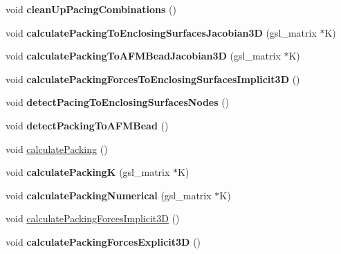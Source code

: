 \begin{DoxyCompactItemize}
\item 
\hypertarget{classSimulation_a7fd4e3930d7be7332fbfd13111c8dedb}{}void {\bfseries clean\+Up\+Pacing\+Combinations} ()\label{classSimulation_a7fd4e3930d7be7332fbfd13111c8dedb}

\item 
\hypertarget{classSimulation_a4b259e3827b74767c8005b2126191609}{}void {\bfseries calculate\+Packing\+To\+Enclosing\+Surfaces\+Jacobian3\+D} (gsl\+\_\+matrix $\ast$K)\label{classSimulation_a4b259e3827b74767c8005b2126191609}

\item 
\hypertarget{classSimulation_abc750480132f54e8b02f24d771863de2}{}void {\bfseries calculate\+Packing\+To\+A\+F\+M\+Bead\+Jacobian3\+D} (gsl\+\_\+matrix $\ast$K)\label{classSimulation_abc750480132f54e8b02f24d771863de2}

\item 
\hypertarget{classSimulation_a3b2d417e1f2814ffd8e34c186508c2f2}{}void {\bfseries calculate\+Packing\+Forces\+To\+Enclosing\+Surfaces\+Implicit3\+D} ()\label{classSimulation_a3b2d417e1f2814ffd8e34c186508c2f2}

\item 
\hypertarget{classSimulation_ac1225a76f3acef7e6ecc175d386b6b86}{}void {\bfseries detect\+Pacing\+To\+Enclosing\+Surfaces\+Nodes} ()\label{classSimulation_ac1225a76f3acef7e6ecc175d386b6b86}

\item 
\hypertarget{classSimulation_a44e5a4a5419d9d12cf0033ccd288b66c}{}void {\bfseries detect\+Packing\+To\+A\+F\+M\+Bead} ()\label{classSimulation_a44e5a4a5419d9d12cf0033ccd288b66c}

\item 
void \hyperlink{classSimulation_a51cb5448f660eeefc54a5d2a33ab561e}{calculate\+Packing} ()
\item 
\hypertarget{classSimulation_a64a53ebf4200a7a0c4b58ccca52d008b}{}void {\bfseries calculate\+Packing\+K} (gsl\+\_\+matrix $\ast$K)\label{classSimulation_a64a53ebf4200a7a0c4b58ccca52d008b}

\item 
\hypertarget{classSimulation_a4e93c41adbaf7ab1d739c026043ab21f}{}void {\bfseries calculate\+Packing\+Numerical} (gsl\+\_\+matrix $\ast$K)\label{classSimulation_a4e93c41adbaf7ab1d739c026043ab21f}

\item 
void \hyperlink{classSimulation_a77e76f4fe61889b9c0ae18436a7fd2fb}{calculate\+Packing\+Forces\+Implicit3\+D} ()
\item 
\hypertarget{classSimulation_aa0ec2fc12dd35ba969ec27f728c3ee77}{}void {\bfseries calculate\+Packing\+Forces\+Explicit3\+D} ()\label{classSimulation_aa0ec2fc12dd35ba969ec27f728c3ee77}


\end{DoxyCompactItemize}
